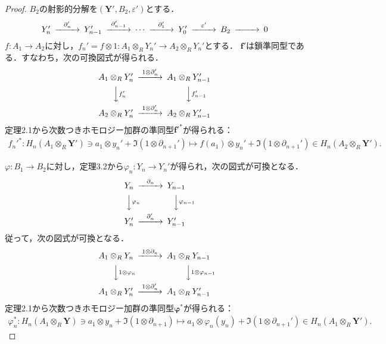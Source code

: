 \begin{proof}
  $B_2$の射影的分解を$(\boldsymbol{Y}', B_2, \varepsilon')$とする．
  \[
  \begin{CD}
    Y_n' @>{\partial_n'}>> Y_{n-1}' @>{\partial_{n-1}'}>> \cdots @>{\partial_1'}>> Y_0' @>{\varepsilon'}>> B_2 @>>> 0
  \end{CD}
  \]
  $f \colon A_1 \to A_2$に対し，$f_n' = f \otimes 1 \colon A_1 \otimes_R Y_n' \to A_2 \otimes_R Y_n'$とする．
  $\boldsymbol{f}'$は鎖準同型である．すなわち，次の可換図式が得られる．
  \[
  \begin{CD}
    A_1 \otimes_R Y_n' @>{1 \otimes \partial_n'}>> A_1 \otimes_R Y_{n-1}' \\
    @VV{f_n'}V @VV{f_{n-1}'}V \\
    A_2 \otimes_R Y_n' @>{1 \otimes \partial_n'}>> A_2 \otimes_R Y_{n-1}'
  \end{CD}
  \]
  定理2.1から次数つきホモロジー加群の準同型$\boldsymbol{f}'^\ast$が得られる：
  \begin{align}
    f_n'^{\ast} \colon H_n(A_1 \otimes_R \boldsymbol{Y}') \ni a_1 \otimes y_n' + \Im (1 \otimes \partial_{n+1}') \mapsto f(a_1) \otimes y_n' + \Im (1 \otimes \partial_{n+1}') \in H_n(A_2 \otimes_R \boldsymbol{Y}'). \label{thm_3_14_eq_2}
  \end{align}

  $\varphi \colon B_1 \to B_2$に対し，定理3.2から$\varphi_n \colon Y_n \to Y_n'$が得られ，次の図式が可換となる．
  \[
  \begin{CD}
    Y_n @>{\partial_n}>> Y_{n-1} \\
    @VV{\varphi_n}V @VV{\varphi_{n-1}}V \\
    Y_n' @>{\partial_n'}>> Y_{n-1}'
  \end{CD}
  \]
  従って，次の図式が可換となる．
  \[
  \begin{CD}
    A_1 \otimes_R Y_n @>{1 \otimes \partial_n}>> A_1 \otimes_R Y_{n-1} \\
    @VV{1 \otimes \varphi_n}V @VV{1 \otimes \varphi_{n-1}}V \\
    A_1 \otimes_R Y_n' @>{1 \otimes \partial_n'}>> A_1 \otimes_R Y_{n-1}'
  \end{CD}
  \]
  定理2.1から次数つきホモロジー加群の準同型$\boldsymbol{\varphi}^\ast$が得られる：
  \begin{align}
    \varphi_n^{\ast} \colon H_n(A_1 \otimes_R \boldsymbol{Y}) \ni a_1 \otimes y_n + \Im (1 \otimes \partial_{n+1}) \mapsto a_1 \otimes \varphi_n(y_n) + \Im (1 \otimes \partial_{n+1}') \in H_n(A_1 \otimes_R \boldsymbol{Y}'). \label{thm_3_14_eq_3}
  \end{align}


\end{proof}
